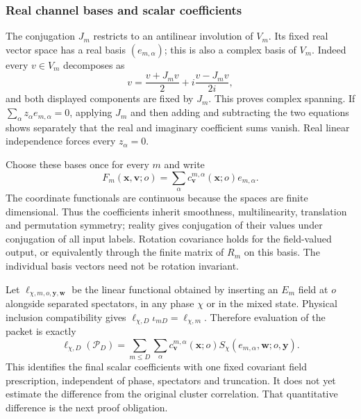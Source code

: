 \subsubsection{Real channel bases and scalar coefficients}
The conjugation $J_m$ restricts to an antilinear involution of $V_m$.
Its fixed real vector space has a real basis $(e_{m,\alpha})$; this is
also a complex basis of $V_m$. Indeed every $v\in V_m$ decomposes as
\[
 v=\frac{v+J_mv}{2}
       +i\frac{v-J_mv}{2i},
\]
and both displayed components are fixed by $J_m$. This proves complex
spanning. If $\sum_\alpha z_\alpha e_{m,\alpha}=0$, applying $J_m$
and then adding and subtracting the two equations shows separately that
the real and imaginary coefficient sums vanish. Real linear independence
forces every $z_\alpha=0$.

Choose these bases once for every $m$ and write
\begin{equation}\label{eq:ope-final-coefficients}
 F_m(\boldsymbol x,\boldsymbol v;o)
   =\sum_\alpha c_{\boldsymbol v}^{m,\alpha}(\boldsymbol x;o)
                                                   e_{m,\alpha}.
\end{equation}
The coordinate functionals are continuous because the spaces are finite
dimensional. Thus the coefficients inherit smoothness, multilinearity,
translation and permutation symmetry; reality gives conjugation of their
values under conjugation of all input labels. Rotation covariance holds
for the field-valued output, or equivalently through the finite matrix of
$R_m$ on this basis. The individual basis vectors need not be rotation
invariant.

Let $\ell_{\chi,m,o,\boldsymbol y,\boldsymbol w}$ be the linear
functional obtained by inserting an $E_m$ field at $o$ alongside separated
spectators, in any phase $\chi$ or in the mixed state. Physical inclusion
compatibility gives
$\ell_{\chi,D}\iota_{mD}=\ell_{\chi,m}$. Therefore evaluation of the
packet is exactly
\[
 \ell_{\chi,D}(\mathcal P_D)
  =\sum_{m\leq D}\sum_\alpha
    c_{\boldsymbol v}^{m,\alpha}(\boldsymbol x;o)
    S_\chi(e_{m,\alpha},\boldsymbol w;o,\boldsymbol y).
\]
This identifies the final scalar coefficients with one fixed covariant
field prescription, independent of phase, spectators and truncation.
It does not yet estimate the difference from the original cluster
correlation. That quantitative difference is the next proof obligation.
